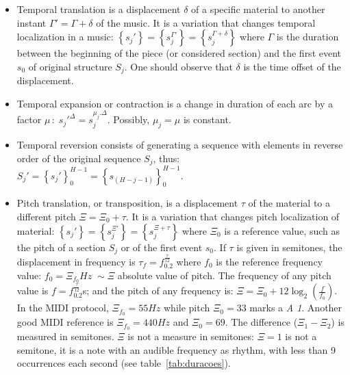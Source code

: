 \begin{itemize}
        \item Temporal translation is a displacement
    $\delta$ of a specific material to another instant $\Gamma'=\Gamma + \delta$
    of the music. It is a variation that changes temporal localization in
    a music:
    $\left\{s_j'\right\}=\left\{s_j^{\Gamma'}\right\}=\left\{s_j^{\Gamma+\delta}\right\}$
    where $\Gamma$ is the duration between the beginning of the piece (or considered
    section) and the first event $s_0$ of original structure $S_j$. One should observe that
    $\delta$ is the time offset of the displacement.

    \item Temporal expansion or contraction is a change in duration of each
    arc by a factor $\mu\,:\; s_j'^{\Delta}=s_j^{\mu_j . \Delta}$. Possibly,
    $\mu_j=\mu$ is constant.

    \item Temporal reversion consists of generating a sequence with elements
    in reverse order of the original sequence $S_j$, thus: $S_j'=\left\{s_j'\right\}_0^{H-1}=\left\{s_{(H-j-1)}\right\}_0^{H-1}$.

    \item Pitch translation, or transposition, is a displacement $\tau$ of the material to a
        different pitch $\Xi=\Xi_0 + \tau$. It is a variation that changes pitch
        localization of material:
        $\left\{s_j'\right\}=\left\{s_j^{\Xi'}\right\}=\left\{s_j^{\Xi+\tau}\right\}$
        where $\Xi_0$ is a reference value, such as the pitch of a section $S_j$ or of the first event $s_0$.
        If $\tau$ is given in semitones, the displacement in
        frequency is $\tau_f=f_0.2^{\frac{\tau}{12}}$ where $f_0$ is the
        reference frequency value: $f_0=\Xi_{f_0}Hz\;\sim \Xi$ absolute value of pitch. The frequency of any pitch value is $f=f_0.2^{\frac{\tau}{12}}$s; 
        and the pitch of any frequency is: $\Xi=\Xi_0 +12
        \log_2\left(\frac{f}{f_0}\right)$.  
        In the MIDI protocol, $\Xi_{f_0}=55Hz$ while pitch $\Xi_0=33$ marks
        a \textit{A 1}. Another good MIDI reference is $\Xi_{f_0}=440Hz$ and
        $\Xi_0=69$. The difference ($\Xi_1 - \Xi_2$) is measured in semitones.
        $\Xi$ is not a measure in semitones: $\Xi=1$ is not a semitone, it is a note with an audible frequency as rhythm, with
        less than 9 occurrences each second (see table~\ref{tab:duracoes}).


\end{itemize}
